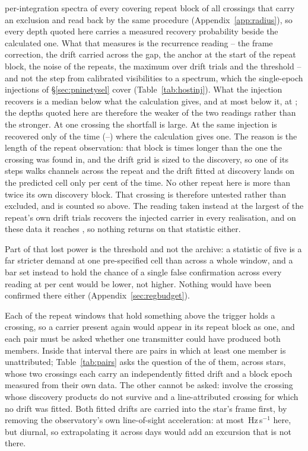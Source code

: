 per-integration spectra of every covering repeat block of all \HjNMeas{}
crossings that carry an exclusion and read back by the same procedure
(Appendix~\ref{app:radius}), so every depth quoted here carries a measured
recovery probability beside the calculated one. What that measures is the recurrence reading
-- the frame correction, the drift carried across the gap, the anchor at the
start of the repeat block, the noise of the repeats, the maximum over drift
trials and the threshold -- and not the step from calibrated visibilities to a
spectrum, which the single-epoch injections of \S\ref{sec:pninetysel} cover
(Table~\ref{tab:hostinj}). What the injection recovers is a median
\HjDevMed{} below what the calculation gives, and at most \HjDevMaxOther{}
below it, at \HjDevStarOther; the depths quoted here are therefore the weaker
of the two readings rather than the stronger. At one crossing the shortfall
is large. At \HjEtaStar{} the same injection is recovered only
\HjEtaMeas{} of the time (\HjEtaLo--\HjEtaHi) where the calculation gives
one. The reason is the length of the repeat observation: that block is
\HjEtaLenRatio{} times longer than the one the crossing was found in, and
the drift grid is sized to the discovery, so one of its steps walks
\HjEtaWalkCh{} channels across the repeat and the drift fitted at discovery
lands on the predicted cell only \HjEtaFracOkPct{} per cent of the time. No
other repeat here is more than twice its own discovery block. That crossing is therefore untested rather than excluded,
and is counted so above. The reading taken instead at the largest of the
repeat's own drift trials recovers the injected carrier in every realisation,
and on these data it reaches \HjEtaMaxReal, so nothing returns on that
statistic either.

Part of that lost power is the threshold and not the archive: a statistic of
five is a far stricter demand at one pre-specified cell than across a whole
window, and a bar set instead to hold the chance of a single false
confirmation across every reading at \ZtFwPct{} per cent would be lower, not
higher. Nothing would have been confirmed there either
(Appendix~\ref{sec:regbudget}).

Each of the \WdNExc{} repeat windows that hold something above the trigger
holds a crossing, so a carrier present again would appear in its repeat block
as one, and each pair must be asked whether one transmitter could have
produced both members. Inside that interval there are
\TjNCandPair{} pairs in which at least
one member is unattributed; Table~\ref{tab:pairs} asks the question of the
\TjNPair{} of them, across \TjNStarPair{} stars, whose two crossings each
carry an independently fitted drift and a block epoch measured from their own
data. The other \TjNCandLost{} cannot be asked: \TjNCandLostSpec{} involve the
crossing whose discovery products do not survive and \TjNCandLostFit{} a
line-attributed crossing for which no drift was fitted. Both fitted drifts are
carried into the star's frame first, by removing the observatory's own
line-of-sight acceleration: at most \TjFrameMaxHzS\,Hz\,s$^{-1}$ here, but
diurnal, so extrapolating it across days would add an excursion that is not
there.

